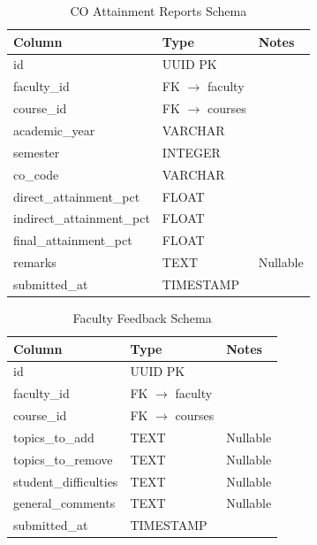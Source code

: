 {\begin{table}[h]
    \centering
    \caption{CO Attainment Reports Schema}
    \begin{tabularx}{\textwidth}{|p{}|p{}|X|}
        \hline
        \textbf{Column} & \textbf{Type} & \textbf{Notes} \\ \hline
        id & UUID PK & \\ \hline
        faculty\_id & FK $\rightarrow$ faculty & \\ \hline
        course\_id & FK $\rightarrow$ courses & \\ \hline
        academic\_year & VARCHAR & \\ \hline
        semester & INTEGER & \\ \hline
        co\_code & VARCHAR & \\ \hline
        direct\_attainment\_pct & FLOAT & \\ \hline
        indirect\_attainment\_pct & FLOAT & \\ \hline
        final\_attainment\_pct & FLOAT & \\ \hline
        remarks & TEXT & Nullable \\ \hline
        submitted\_at & TIMESTAMP & \\ \hline
    \end{tabularx}
\end{table}

\begin{table}[h]
    \centering
    \caption{Faculty Feedback Schema}
    \begin{tabularx}{\textwidth}{|p{}|p{}|X|}
        \hline
        \textbf{Column} & \textbf{Type} & \textbf{Notes} \\ \hline
        id & UUID PK & \\ \hline
        faculty\_id & FK $\rightarrow$ faculty & \\ \hline
        course\_id & FK $\rightarrow$ courses & \\ \hline
        topics\_to\_add & TEXT & Nullable \\ \hline
        topics\_to\_remove & TEXT & Nullable \\ \hline
        student\_difficulties & TEXT & Nullable \\ \hline
        general\_comments & TEXT & Nullable \\ \hline
        submitted\_at & TIMESTAMP & \\ \hline
    \end{tabularx}
\end{table}

}
